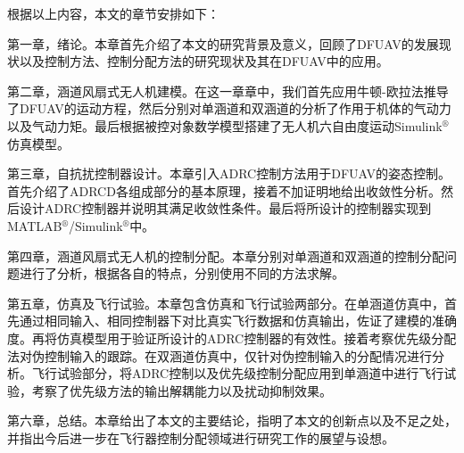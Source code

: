 根据以上内容，本文的章节安排如下：

第一章，绪论。本章首先介绍了本文的研究背景及意义，回顾了DFUAV的发展现状以及控制方法、控制分配方法的研究现状及其在DFUAV中的应用。

第二章，涵道风扇式无人机建模。在这一章章中，我们首先应用牛顿-欧拉法推导了DFUAV的运动方程，然后分别对单涵道和双涵道的分析了作用于机体的气动力以及气动力矩。最后根据被控对象数学模型搭建了无人机六自由度运动Simulink$^\circledR$仿真模型。

第三章，自抗扰控制器设计。本章引入ADRC控制方法用于DFUAV的姿态控制。首先介绍了ADRCD各组成部分的基本原理，接着不加证明地给出收敛性分析。然后设计ADRC控制器并说明其满足收敛性条件。最后将所设计的控制器实现到MATLAB$^\circledR$/Simulink$^\circledR$中。

第四章，涵道风扇式无人机的控制分配。本章分别对单涵道和双涵道的控制分配问题进行了分析，根据各自的特点，分别使用不同的方法求解。

第五章，仿真及飞行试验。本章包含仿真和飞行试验两部分。在单涵道仿真中，首先通过相同输入、相同控制器下对比真实飞行数据和仿真输出，佐证了建模的准确度。再将仿真模型用于验证所设计的ADRC控制器的有效性。接着考察优先级分配法对伪控制输入的跟踪。在双涵道仿真中，仅针对伪控制输入的分配情况进行分析。飞行试验部分，将ADRC控制以及优先级控制分配应用到单涵道中进行飞行试验，考察了优先级方法的输出解耦能力以及扰动抑制效果。

第六章，总结。本章给出了本文的主要结论，指明了本文的创新点以及不足之处，并指出今后进一步在飞行器控制分配领域进行研究工作的展望与设想。

